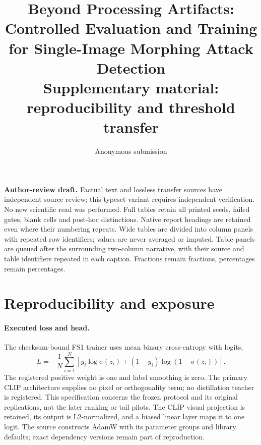 \documentclass[10pt,twocolumn,letterpaper]{article}
\title{Beyond Processing Artifacts: Controlled Evaluation and Training\\for Single-Image Morphing Attack Detection\\Supplementary material: reproducibility and threshold transfer}
\author{Anonymous submission}
\begin{document}
\maketitle
\noindent\textbf{Author-review draft.} Factual text and lossless transfer sources have independent source review; this typeset variant requires independent verification. No new scientific read was performed. Full tables retain all printed seeds, failed gates, blank cells and post-hoc distinctions. Native report headings are retained even where their numbering repeats. Wide tables are divided into column panels with repeated row identifiers; values are never averaged or imputed. Table panels are queued after the surrounding two-column narrative, with their source and table identifiers repeated in each caption. Fractions remain fractions, percentages remain percentages.\par
\section{Reproducibility and exposure}
\label{sec:supp-reproducibility}
\paragraph{Executed loss and head.}
The checksum-bound FS1 trainer uses mean binary cross-entropy with logits,
\begin{equation}
 L=-\frac1N\sum_{i=1}^N[y_i\log\sigma(z_i)+(1-y_i)\log(1-\sigma(z_i))].
\end{equation}
The registered positive weight is one and label smoothing is zero. The primary CLIP architecture supplies no pixel or orthogonality term; no distillation teacher is registered. This specification concerns the frozen protocol and its original replications, not the later ranking or tail pilots. The CLIP visual projection is retained, its output is L2-normalized, and a biased linear layer maps it to one logit. The source constructs AdamW with its parameter groups and library defaults; exact dependency versions remain part of reproduction.
\end{document}
